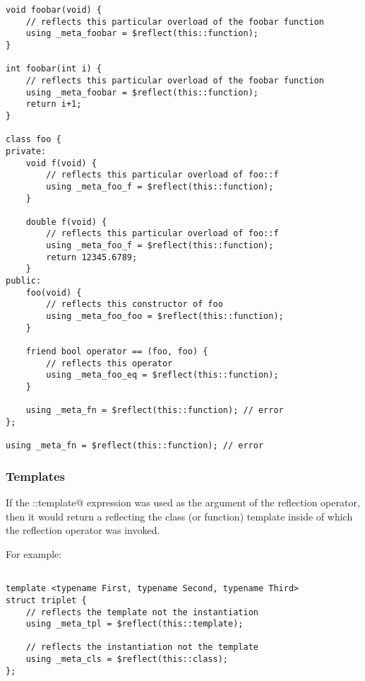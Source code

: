 \begin{verbatim}
void foobar(void) {
	// reflects this particular overload of the foobar function
	using _meta_foobar = $reflect(this::function);
}

int foobar(int i) {
	// reflects this particular overload of the foobar function
	using _meta_foobar = $reflect(this::function);
	return i+1;
}

class foo {
private:
	void f(void) {
		// reflects this particular overload of foo::f
		using _meta_foo_f = $reflect(this::function);
	}

	double f(void) {
		// reflects this particular overload of foo::f
		using _meta_foo_f = $reflect(this::function);
		return 12345.6789;
	}
public:
	foo(void) {
		// reflects this constructor of foo
		using _meta_foo_foo = $reflect(this::function);
	}

	friend bool operator == (foo, foo) {
		// reflects this operator
		using _meta_foo_eq = $reflect(this::function);
	}

	using _meta_fn = $reflect(this::function); // error
};

using _meta_fn = $reflect(this::function); // error
\end{verbatim}

\subsubsection{Templates}

If the \verb@this::template@ expression was used as the argument of the reflection
operator, then it would return a  reflecting the class (or function)
template inside of which the reflection operator was invoked.

For example:

\begin{verbatim}

template <typename First, typename Second, typename Third>
struct triplet {
	// reflects the template not the instantiation
	using _meta_tpl = $reflect(this::template);

	// reflects the instantiation not the template
	using _meta_cls = $reflect(this::class);
};
\end{verbatim}
